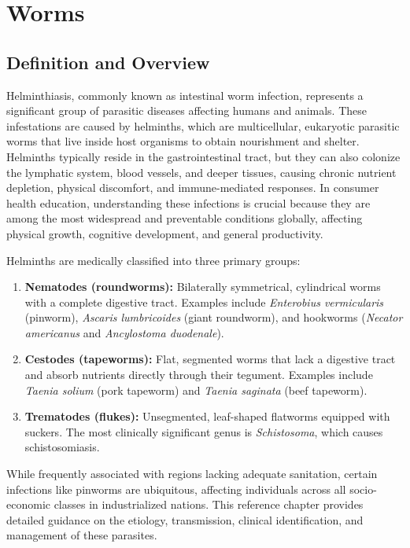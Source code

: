 \chapter{Worms}

\section*{Definition and Overview}
Helminthiasis, commonly known as intestinal worm infection, represents a significant group of parasitic diseases affecting humans and animals. These infestations are caused by helminths, which are multicellular, eukaryotic parasitic worms that live inside host organisms to obtain nourishment and shelter. Helminths typically reside in the gastrointestinal tract, but they can also colonize the lymphatic system, blood vessels, and deeper tissues, causing chronic nutrient depletion, physical discomfort, and immune-mediated responses. In consumer health education, understanding these infections is crucial because they are among the most widespread and preventable conditions globally, affecting physical growth, cognitive development, and general productivity.

Helminths are medically classified into three primary groups:
\begin{enumerate}
    \item \textbf{Nematodes (roundworms):} Bilaterally symmetrical, cylindrical worms with a complete digestive tract. Examples include \textit{Enterobius vermicularis} (pinworm), \textit{Ascaris lumbricoides} (giant roundworm), and hookworms (\textit{Necator americanus} and \textit{Ancylostoma duodenale}).
    \item \textbf{Cestodes (tapeworms):} Flat, segmented worms that lack a digestive tract and absorb nutrients directly through their tegument. Examples include \textit{Taenia solium} (pork tapeworm) and \textit{Taenia saginata} (beef tapeworm).
    \item \textbf{Trematodes (flukes):} Unsegmented, leaf-shaped flatworms equipped with suckers. The most clinically significant genus is \textit{Schistosoma}, which causes schistosomiasis.
\end{enumerate}

While frequently associated with regions lacking adequate sanitation, certain infections like pinworms are ubiquitous, affecting individuals across all socio-economic classes in industrialized nations. This reference chapter provides detailed guidance on the etiology, transmission, clinical identification, and management of these parasites.

